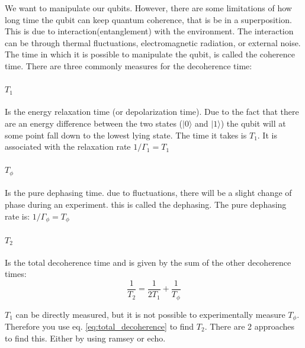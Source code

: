    We want to manipulate our qubits. However, there are some limitations of how long time the qubit can keep quantum coherence, that is be in a superposition. This is due to interaction(entanglement) with the environment. The interaction can be through thermal fluctuations,  electromagnetic radiation, or external noise. The time in which it is possible to manipulate the qubit, is called the coherence time. There are three commonly measures for the decoherence time:
    
    \paragraph{$T_1$} Is the energy relaxation time (or depolarization time). Due to the fact that there are an energy difference between the two states ($|0\rangle$ and $|1\rangle$) the qubit will at some point fall down to the lowest lying state. The time it takes is $T_1$. It is associated with the relaxation rate $1/\Gamma_1 = T_1$
    
    \paragraph{$T_{\phi}$} Is the pure dephasing time.  due to fluctuations, there will be a slight change of phase during an experiment. this is called the dephasing. The pure dephasing rate is: $1/\Gamma_{\phi} = T_\phi$


    \paragraph{$T_2$} Is the total decoherence time and is given by the sum of the other decoherence times: 
        \begin{equation}\label{eq:total_decoherence}
            \frac{1}{T_2} = \frac{1}{2T_1} + \frac{1}{T_{\phi}} 
        \end{equation}

    $T_1$ can be directly measured, but it is not possible to experimentally measure $T_{\phi}$. Therefore you use eq. \ref{eq:total_decoherence} to find $T_2$. There are 2 approaches to find this. Either by using ramsey or echo. 
        
